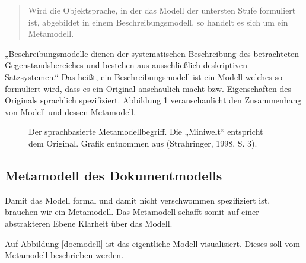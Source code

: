  
\begin{quote}
 Wird die Objektsprache, in der das Modell der untersten Stufe formuliert ist, abgebildet in einem Beschreibungsmodell, so handelt es sich um ein Metamodell. \citep[S.~3]{Strahringer}
\end{quote}
 
„Beschreibungsmodelle dienen der systematischen Beschreibung des betrachteten Gegenstandsbereiches und bestehen aus ausschließlich deskriptiven Satzsystemen.“ Das heißt, ein Beschreibungsmodell ist ein Modell welches so formuliert wird, dass es ein Original anschaulich macht bzw. Eigenschaften des Originals sprachlich spezifiziert. Abbildung \ref{metamodellbegriff} veranschaulicht den Zusammenhang von Modell und dessen Metamodell.

 
\begin{figure}[h!]
\centering
\advance\leftskip-2.5cm
\caption{ Der sprachbasierte Metamodellbegriff. Die „Miniwelt“ entspricht dem Original. Grafik entnommen aus (Strahringer, 1998, S. 3). }\label{metamodellbegriff}
\end{figure}
 
\subsection{Metamodell des Dokumentmodells}\label{metamodell_dokument}
 
Damit das Modell formal und damit nicht verschwommen spezifiziert ist, brauchen wir ein Metamodell. Das Metamodell schafft somit auf einer abstrakteren Ebene Klarheit über das Modell.

 
Auf Abbildung \ref{docmodell} ist das eigentliche Modell visualisiert. Dieses soll vom Metamodell beschrieben werden.


